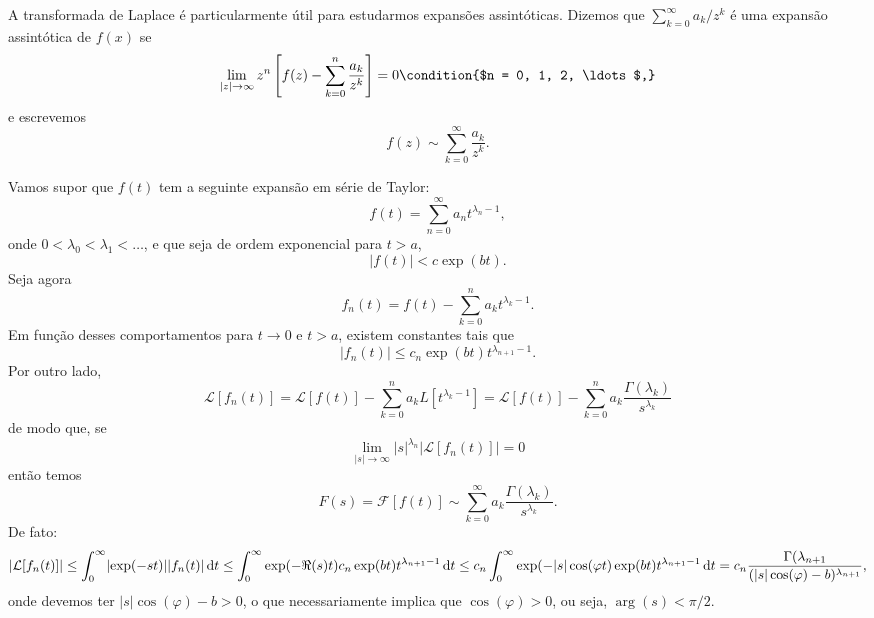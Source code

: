 \begin{exem}
  A transformada de Laplace é particularmente útil para estudarmos expansões
  assintóticas. Dizemos que $\sum_{k = 0}^{\infty} a_k / z^k$ é uma expansão
  assintótica de $f(x)$ se
  \begin{dmath*}
    \lim_{\lvert z \rvert \to \infty} z^n \left[ f(z) - \sum_{k = 0}^n \frac{a_k}{z^k}
    \right] = 0 \condition{$n = 0, 1, 2, \ldots$,}
  \end{dmath*}
  e escrevemos
  \begin{dmath*}
    f(z) \sim \sum_{k = 0}^{\infty} \frac{a_k}{z^k}.
  \end{dmath*}

  Vamos supor que $f(t)$ tem a seguinte expansão em série de Taylor:
  \begin{dmath*}
    f(t) = \sum_{n = 0}^{\infty} a_n t^{\lambda_n - 1},
  \end{dmath*}
  onde $0 < \lambda_0 < \lambda_1 < \ldots$, e que seja de ordem exponencial
  para $t > a$,
  \begin{dmath*}
    \lvert f(t) \rvert < c \exp(b t).
  \end{dmath*}
  Seja agora
  \begin{dmath*}
    f_n(t) = f(t) - \sum_{k = 0}^n a_k t^{\lambda_k - 1}.
  \end{dmath*}
  Em função desses comportamentos para $t \to 0$ e $t > a$, existem constantes
  tais que
  \begin{dmath*}
    \lvert f_n(t) \rvert \leq c_n \exp(b t) t^{\lambda_{n + 1} - 1}.
  \end{dmath*}
  Por outro lado,
  \begin{dmath*}
    \mathcal{L}[f_n(t)] = \mathcal{L}[f(t)] - \sum_{k = 0}^n a_k L[t^{\lambda_k
    - 1}]
    = \mathcal{L}[f(t)] - \sum_{k = 0}^n a_k
    \frac{\Gamma(\lambda_k)}{s^{\lambda_k}}
  \end{dmath*}
  de modo que, se
  \begin{dmath*}
    \lim_{\lvert s \rvert \to \infty} \lvert s \rvert^{\lambda_n} \lvert
    \mathcal{L}[f_n(t)] \rvert = 0
  \end{dmath*}
  então temos
  \begin{dmath*}
    F(s) = \mathcal{F}[f(t)]
    \sim \sum_{k = 0}^{\infty} a_k \frac{\Gamma(\lambda_k)}{s^{\lambda_k}}.
  \end{dmath*}
  De fato:
  \begin{dmath*}
    \lvert\mathcal{L}[f_n(t)]\rvert \leq \int_0^{\infty} \lvert\exp(-s
    t)\rvert \lvert f_n(t) \rvert \vi{t}
    \leq \int_0^{\infty} \exp(-\Re(s) t) c_n \exp(b t) t^{\lambda_{n + 1} - 1}
    \vi{t}
    \leq c_n \int_0^{\infty} \exp(-\lvert s \rvert \cos(\varphi t) \exp(b t) t^{\lambda_{n
    + 1} - 1} \vi{t}
    = c_n \frac{\Gamma(\lambda_{n + 1}}{(\lvert s \rvert \cos(\varphi) - b)^{\lambda_{n +
    1}}},
  \end{dmath*}
  onde devemos ter $\lvert s \rvert \cos(\varphi) - b > 0$, o que
  necessariamente implica que $\cos(\varphi) > 0$, ou seja, $\arg(s) < \pi / 2$.


\end{exem}
